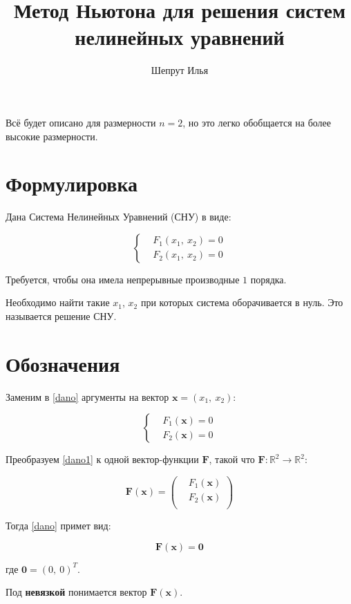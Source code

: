 \documentclass[12pt, a4paper]{article}
\newcommand{\roubr}[1]{\left(#1\right)}
\begin{document}
\title{Метод Ньютона для решения систем нелинейных уравнений}
\author{Шепрут Илья}
\maketitle

Всё будет описано для размерности $n = 2$, но это легко обобщается на более высокие размерности.

\setlength{\columnsep}{30pt}
\begin{multicols}{2}

\section{Формулировка}

Дана Система Нелинейных Уравнений (СНУ) в виде:

\begin{equation}\label{dano}
\left\{
\begin{aligned}
	&F_1(x_1,\ x_2) = 0 \\
	&F_2(x_1,\ x_2) = 0
\end{aligned}
\right.
\end{equation}

Требуется, чтобы она имела непрерывные производные $1$ порядка.

Необходимо найти такие $x_1$, $x_2$ при которых система оборачивается в нуль. Это называется решение СНУ.

\section{Обозначения}

Заменим в \eqref{dano} аргументы на вектор $\mathbf{x} = (x_1,\ x_2)$:

\begin{equation}\label{dano1}
\left\{
\begin{aligned}
	&F_1(\mathbf{x}) = 0 \\
	&F_2(\mathbf{x}) = 0
\end{aligned}
\right.
\end{equation}

Преобразуем \eqref{dano1} к одной вектор-функции $\mathbf{F}$, такой что $ \mathbf{F} : \mathbb{R}^2 \to \mathbb{R}^2 $:

$$\mathbf{F}(\mathbf{x}) = \roubr{
\begin{aligned}
	&F_1(\mathbf{x})\\
	&F_2(\mathbf{x})\\
\end{aligned}
}
$$

Тогда \eqref{dano} примет вид:

\begin{equation}\label{dano2}
\mathbf{F}(\mathbf{x}) = \mathbf{0}
\end{equation}

где $\mathbf{0}= (0,\ 0)^T$.

Под \textbf{невязкой} понимается вектор $\mathbf{F}(\mathbf{x})$.

\end{multicols}
\end{document}
